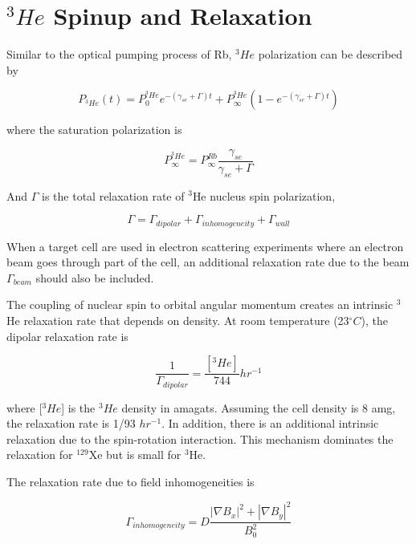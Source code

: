 \section{$^{3}He$ Spinup and Relaxation}

Similar to the optical pumping process of Rb, $^{3}He$ polarization can be described by

\begin{equation}
P_{^{3}He}(t)=P_{0}^{^{3}He}e^{-(\gamma_{se}+\Gamma)t}+P_{\infty}^{^{3}He}(1-e^{-(\gamma_{se}+\Gamma)t})
\end{equation}

where the saturation polarization is

\begin{equation}
P_{\infty}^{^{3}He}=P_{\infty}^{Rb}\frac{\gamma_{se}}{\gamma_{se}+\Gamma}
\end{equation}

And $\Gamma$ is the total relaxation rate of $^{3}$He nucleus spin polarization,

\begin{equation}
\Gamma=\Gamma_{dipolar}+\Gamma_{inhomogeneity}+\Gamma_{wall}
\end{equation}

When a target cell are used in electron scattering experiments where an electron beam goes through part of the cell, an additional relaxation rate due to the beam $\Gamma_{beam}$ should also be included.

The coupling of nuclear spin to orbital angular momentum creates an intrinsic $^{3}$He relaxation rate that depends on density. At room temperature (23$^{\circ}C$), the dipolar relaxation rate is 

\begin{equation}
\frac{1}{\Gamma_{dipolar}}=\frac{[^{3}He]}{744}hr^{-1}
\end{equation}


where [$^{3}He$] is the $^{3}He$ density in amagats. Assuming the cell density is 8 amg, the relaxation rate is 1/93 $hr^{-1}$. In addition, there is an additional intrinsic relaxation due to the spin-rotation interaction. This mechanism dominates the relaxation for $^{129}$Xe but is small for $^{3}$He. 

The relaxation rate due to field inhomogeneities is

\begin{equation}
\Gamma_{inhomogeneity} = D\frac{|\nabla B_{x}|^{2}+|\nabla B_{y}|^{2}}{B_{0}^{2}}
\end{equation}

